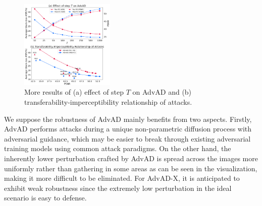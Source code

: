 \documentclass{article}
\begin{document}
\begin{figure}  %
\vspace{-0.5cm}
\setlength{\abovecaptionskip}{0.15cm}
\centering
\includegraphics[width=0.4\textwidth]{figures/re_new_fig_v.pdf}
\caption{More results of (a) effect of step $T$ on AdvAD and (b) transferability-imperceptibility relationship of attacks.}
\label{fig:4}
\vspace{-1cm}
\end{figure}


We suppose the robustness of AdvAD mainly benefits from two aspects. Firstly, AdvAD performs attacks during a unique non-parametric diffusion process with adversarial guidance, which may be easier to break through existing adversarial training models using common attack paradigms. On the other hand, the inherently lower perturbation crafted by AdvAD is spread across the images more uniformly rather than gathering in some areas as can be seen in the visualization, making it more difficult to be eliminated. For AdvAD-X, it is anticipated to exhibit weak robustness since the extremely low perturbation in the ideal scenario is easy to defense.
\end{document}
